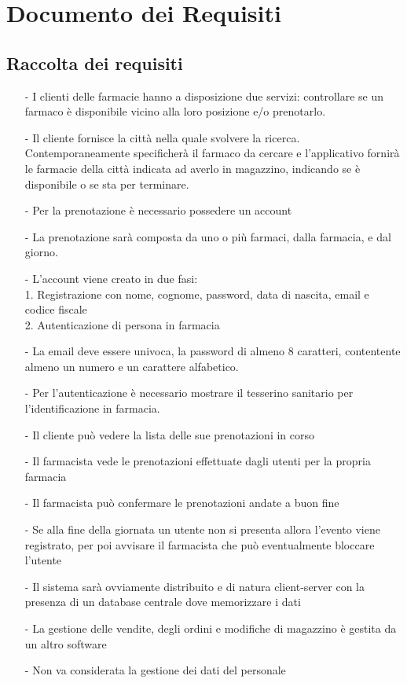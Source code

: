 \newpage
\section{Documento dei Requisiti}

\subsection{Raccolta dei requisiti}

\begin{itemize}
  \item[-] I clienti delle farmacie hanno a disposizione due servizi: controllare se un farmaco è disponibile vicino alla loro posizione e/o prenotarlo.
  \item[-] Il cliente fornisce la città nella quale svolvere la ricerca. Contemporaneamente specificherà il
      farmaco da cercare e l'applicativo fornirà le farmacie della città indicata ad
      averlo in magazzino, indicando se è disponibile o se sta per terminare.
  \item[-] Per la prenotazione è necessario possedere un account
  \item[-] La prenotazione sarà composta da uno o più farmaci, dalla farmacia, e dal giorno. 
  \item[-] L'account viene creato in due fasi:\\
      1. Registrazione con nome, cognome, password, data di nascita, email e codice fiscale\\
      2. Autenticazione di persona in farmacia
  \item[-] La email deve essere univoca, la password di almeno 8 caratteri, contentente almeno un numero e un carattere alfabetico.
  \item[-] Per l'autenticazione è necessario mostrare il tesserino sanitario per l'identificazione in farmacia.
  \item[-] Il cliente può vedere la lista delle sue prenotazioni in corso
  \item[-] Il farmacista vede le prenotazioni effettuate dagli utenti per la propria farmacia
  \item[-] Il farmacista può confermare le prenotazioni andate a buon fine
  \item[-] Se alla fine della giornata un utente non si presenta allora l'evento viene registrato, per poi avvisare il farmacista che può eventualmente bloccare l'utente
  \item[-] Il sistema sarà ovviamente distribuito e di natura client-server con la presenza di un database centrale dove memorizzare i dati
  \item[-] La gestione delle vendite, degli ordini e modifiche di magazzino è gestita da un altro software
  \item[-] Non va considerata la gestione dei dati del personale 
\end{itemize}


